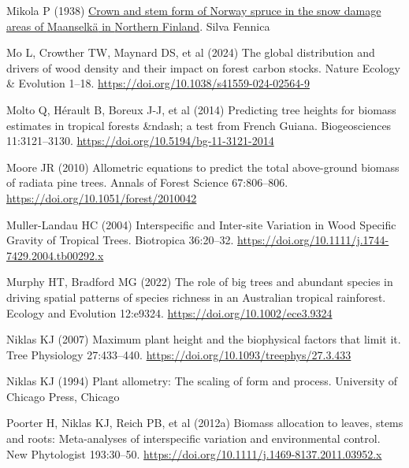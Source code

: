 \documentclass[
  12pt,
  letterpaper,
  DIV=11,
  numbers=noendperiod]{scrartcl}
\newlength{\cslhangindent}
\newlength{\cslentryspacingunit} %
\newenvironment{CSLReferences}[2] %
 {%
  \setlength{\parindent}{0pt}
  \ifodd #1
  \let\oldpar\par
  \def\par{\hangindent=\cslhangindent\oldpar}
  \fi
  \setlength{\parskip}{#2\cslentryspacingunit}
 }%
 {}
\begin{document}
\begin{CSLReferences}{1}{0}
\leavevmode{}%
Mikola P (1938) \href{https://www.silvafennica.fi/article/4546}{Crown
and stem form of {Norway} spruce in the snow damage areas of {Maanselkä}
in {Northern} {Finland}}. Silva Fennica

\leavevmode{}%
Mo L, Crowther TW, Maynard DS, et al (2024) The global distribution and
drivers of wood density and their impact on forest carbon stocks. Nature
Ecology \& Evolution 1--18.
\url{https://doi.org/10.1038/s41559-024-02564-9}

\leavevmode{}%
Molto Q, Hérault B, Boreux J-J, et al (2014) Predicting tree heights for
biomass estimates in tropical forests \&ndash; a test from {French}
{Guiana}. Biogeosciences 11:3121--3130.
\url{https://doi.org/10.5194/bg-11-3121-2014}

\leavevmode{}%
Moore JR (2010) Allometric equations to predict the total above-ground
biomass of radiata pine trees. Annals of Forest Science 67:806--806.
\url{https://doi.org/10.1051/forest/2010042}

\leavevmode{}%
Muller-Landau HC (2004) Interspecific and {Inter}-site {Variation} in
{Wood} {Specific} {Gravity} of {Tropical} {Trees}. Biotropica 36:20--32.
\url{https://doi.org/10.1111/j.1744-7429.2004.tb00292.x}

\leavevmode{}%
Murphy HT, Bradford MG (2022) The role of big trees and abundant species
in driving spatial patterns of species richness in an {Australian}
tropical rainforest. Ecology and Evolution 12:e9324.
\url{https://doi.org/10.1002/ece3.9324}

\leavevmode{}%
Niklas KJ (2007) Maximum plant height and the biophysical factors that
limit it. Tree Physiology 27:433--440.
\url{https://doi.org/10.1093/treephys/27.3.433}

\leavevmode{}%
Niklas KJ (1994) Plant allometry: The scaling of form and process.
University of Chicago Press, Chicago

\leavevmode{}%
Poorter H, Niklas KJ, Reich PB, et al (2012a) Biomass allocation to
leaves, stems and roots: Meta-analyses of interspecific variation and
environmental control. New Phytologist 193:30--50.
\url{https://doi.org/10.1111/j.1469-8137.2011.03952.x}


\end{CSLReferences}
\end{document}
